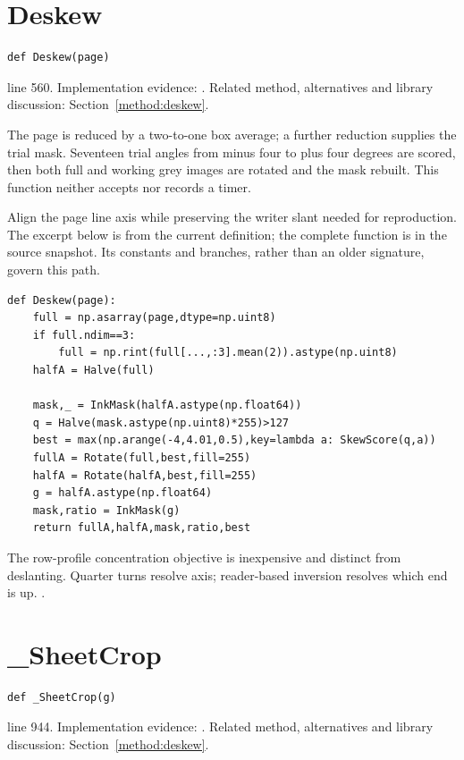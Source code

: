 \section{Deskew}\label{fn:segment:Deskew}
\begin{lstlisting}[style=sig]
def Deskew(page)
\end{lstlisting}
 line 560. Implementation evidence: \cite{code2026}. Related method, alternatives and library discussion: Section~\ref{method:deskew}.


The page is reduced by a two-to-one box average; a further reduction supplies the trial mask. Seventeen trial angles from minus four to plus four degrees are scored, then both full and working grey images are rotated and the mask rebuilt. This function neither accepts nor records a timer.


Align the page line axis while preserving the writer slant needed for reproduction. The excerpt below is from the current definition; the complete function is in the source snapshot. Its constants and branches, rather than an older signature, govern this path.


\begin{lstlisting}[style=plain]
def Deskew(page):
    full = np.asarray(page,dtype=np.uint8)
    if full.ndim==3:
        full = np.rint(full[...,:3].mean(2)).astype(np.uint8)
    halfA = Halve(full)

    mask,_ = InkMask(halfA.astype(np.float64))
    q = Halve(mask.astype(np.uint8)*255)>127
    best = max(np.arange(-4,4.01,0.5),key=lambda a: SkewScore(q,a))
    fullA = Rotate(full,best,fill=255)
    halfA = Rotate(halfA,best,fill=255)
    g = halfA.astype(np.float64)
    mask,ratio = InkMask(g)
    return fullA,halfA,mask,ratio,best
\end{lstlisting}
The row-profile concentration objective is inexpensive and distinct from deslanting. Quarter turns resolve axis; reader-based inversion resolves which end is up. \cite{postl1986,wolberg1990,opencvtransform,pillowops}.


\section{\_SheetCrop}\label{fn:segment:-SheetCrop}
\begin{lstlisting}[style=sig]
def _SheetCrop(g)
\end{lstlisting}
 line 944. Implementation evidence: \cite{code2026}. Related method, alternatives and library discussion: Section~\ref{method:deskew}.


